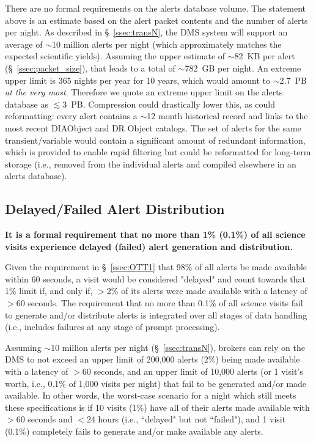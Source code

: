 \documentclass[DM,lsstdraft,authoryear,toc]{lsstdoc}
\begin{document}
There are no formal requirements on the alerts database volume. The statement above is an estimate based on the alert packet contents and the number of alerts per night. As described in \S~\ref{ssec:transN}, the DMS system will support an average of $\sim$10 million alerts per night (which approximately matches the expected scientific yields). Assuming the upper estimate of $\sim$82~KB per alert (\S~\ref{ssec:packet_size}), that leads to a total of $\sim$782~GB per night. An extreme upper limit is 365 nights per year for 10 years, which would amount to $\sim$2.7~PB {\it at the very most}. Therefore we quote an extreme upper limit on the alerts database as $\lesssim$3~PB. Compression could drastically lower this, as could reformatting: every alert contains a $\sim$12 month historical record and links to the most recent DIAObject and DR Object catalogs. The set of alerts for the same transient/variable would contain a significant amount of redundant information, which is provided to enable rapid filtering but could be reformatted for long-term storage (i.e., removed from the individual alerts and compiled elsewhere in an alerts database). 


\subsection{Delayed/Failed Alert Distribution}\label{ssec:OTR1}

{\bf It is a formal requirement that no more than 1\% (0.1\%) of all science visits experience delayed (failed) alert generation and distribution.}

Given the requirement in \S~\ref{ssec:OTT1} that 98\% of all alerts be made available within 60 seconds, a visit would be considered "delayed" and count towards that 1\% limit if, and only if, $>$2\% of its alerts were made available with a latency of $>$60 seconds. The requirement that no more than 0.1\% of all science visits fail to generate and/or distribute alerts is integrated over all stages of data handling (i.e., includes failures at any stage of prompt processing).

Assuming $\sim$10 million alerts per night (\S~\ref{ssec:transN}), brokers can rely on the DMS to not exceed an upper limit of 200,000 alerts (2\%) being made available with a latency of $>$60 seconds, and an upper limit of 10,000 alerts (or 1 visit's worth, i.e., 0.1\% of 1,000 visits per night) that fail to be generated and/or made available. In other words, the worst-case scenario for a night which still meets these specifications is if 10 visits (1\%) have all of their alerts made available with $>$60 seconds and $<$24 hours (i.e., ``delayed" but not ``failed"), and 1 visit (0.1\%) completely fails to generate and/or make available any alerts.
\end{document}
